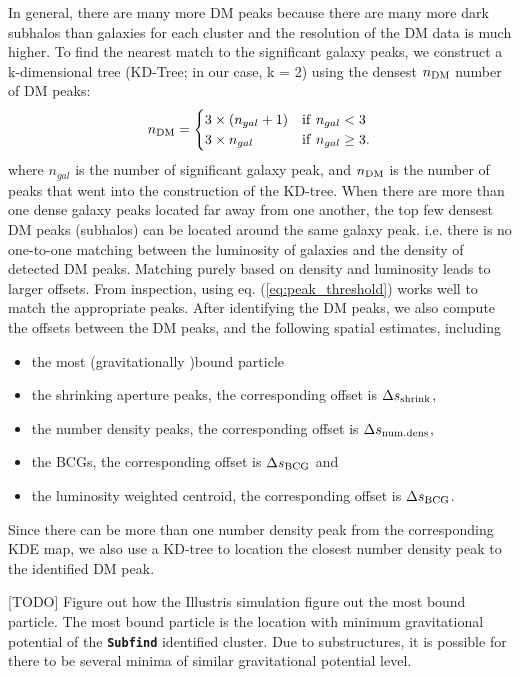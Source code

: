 In general, there are many more DM peaks because there are many more dark 
subhalos than galaxies for each cluster and the resolution of the DM data is
much higher. To find the nearest match to the significant galaxy peaks,  
we construct a k-dimensional tree (KD-Tree; in our case, k = 2) 
using the densest $n_{\rm DM}$  number of DM peaks:
\begin{equation}
	n_{\rm DM} = \begin{cases}		
		3 \times (n_{gal} + 1) & {\rm if~} n_{gal} < 3 \\
	3 \times n_{gal}  & {\rm if~} n_{gal} \geq 3.
	\end{cases}
	\label{eq:peak_threshold}
\end{equation}
where $n_{gal}$ is the number of significant galaxy peak, and $n_{\rm DM}$
is the number of peaks that went into the construction of the KD-tree.
When there are more
than one dense galaxy peaks located far away from one another, 
the top few densest DM peaks (subhalos) 
can be located around the same galaxy peak.
i.e. there is no one-to-one matching between the luminosity of galaxies and the
density of detected DM peaks.
Matching purely based on density and luminosity leads to larger offsets.
From inspection, using eq. (\ref{eq:peak_threshold}) works well to match the 
appropriate peaks.  After identifying the DM peaks, we also compute the 
offsets 
between the DM peaks, and the following spatial estimates, including 
\begin{itemize}
	\item the most (gravitationally )bound particle 
	\item the shrinking aperture peaks, the corresponding offset is $\Delta s_{\rm
		shrink}$, 
	\item the number density peaks, the corresponding offset is $\Delta s_{\rm
		num.dens}$, 
	\item the BCGs, the corresponding offset is $\Delta s_{\rm BCG}$ and
\item the luminosity weighted centroid, the corresponding offset is $\Delta s_{\rm BCG}$.
\end{itemize}
Since there can be more than one number density peak from the corresponding KDE
map, we also use a KD-tree to location the closest number density peak to the 
identified DM peak.

[TODO] Figure out how the Illustris simulation figure out the most bound 
particle.
The most bound particle is the location with minimum 
gravitational potential of the {\bf \texttt{Subfind}} identified cluster.
Due to substructures, it is possible for there to be several minima of similar 
gravitational potential level. 

